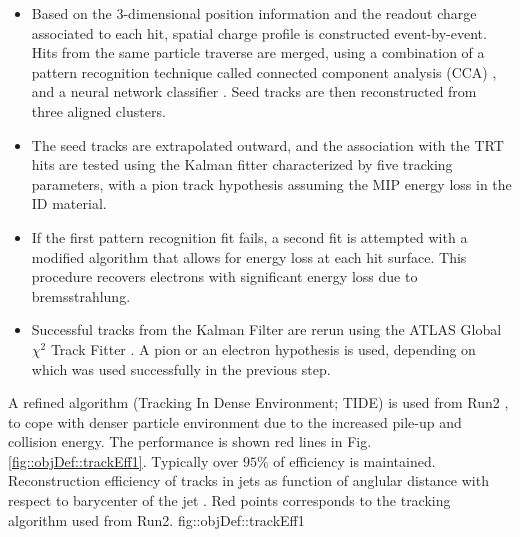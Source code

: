\begin{itemize}
\item Based on the 3-dimensional position information and the readout charge associated to each hit, 
spatial charge profile is constructed event-by-event. 
Hits from the same particle traverse are merged, using a combination of a pattern recognition technique called connected component analysis (CCA) \cite{CCApatterRecog}, and a neural network classifier \cite{NNClustering}.
Seed tracks are then reconstructed from three aligned clusters.

\item The seed tracks are extrapolated outward,
and the association with the TRT hits are tested using the Kalman fitter characterized by five tracking parameters,
with a pion track hypothesis assuming the MIP energy loss in the ID material.

\item If the first pattern recognition fit fails, a second fit is attempted with a modified algorithm that allows for energy loss at each hit surface. This procedure recovers electrons with significant energy loss due to bremsstrahlung.

\item Successful tracks from the Kalman Filter are rerun using the ATLAS Global $\chi^2$ Track Fitter \cite{157_ATLASGlobTrackFitter}.
A pion or an electron hypothesis is used, depending on which was used successfully in the previous step.

\end{itemize}
A refined algorithm (Tracking In Dense Environment; TIDE) is used from Run2 \cite{130_trackingRun2}, 
to cope with denser particle environment due to the increased pile-up and collision energy.
The performance is shown red lines in Fig. \ref{fig::objDef::trackEff1}. Typically over $95\%$ of efficiency is maintained. \\ 

{Reconstruction efficiency of tracks in jets as function of anglular distance with respect to barycenter of the jet \cite{130_trackingRun2}}. Red points corresponds to the tracking algorithm used from Run2.
{fig::objDef::trackEff1}



